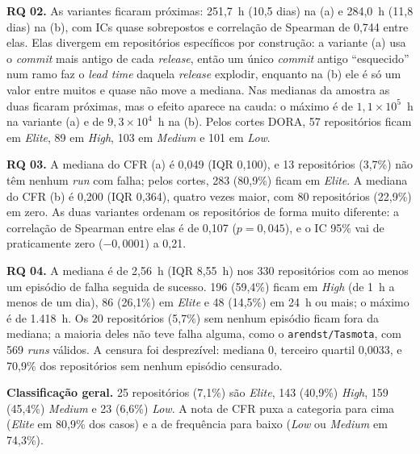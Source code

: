\textbf{RQ 02.} As variantes ficaram próximas: 251,7~h (10,5 dias) na (a) e 284,0~h (11,8
dias) na (b), com ICs quase sobrepostos e correlação de Spearman de 0,744 entre elas. Elas
divergem em repositórios específicos por construção: a variante (a) usa o \textit{commit}
mais antigo de cada \textit{release}, então um único \textit{commit} antigo ``esquecido'' num
ramo faz o \textit{lead time} daquela \textit{release} explodir, enquanto na (b) ele é só um
valor entre muitos e quase não move a mediana. Nas medianas da amostra as duas ficaram
próximas, mas o efeito aparece na cauda: o máximo é de $1{,}1 \times 10^{5}$~h na variante (a)
e de $9{,}3 \times 10^{4}$~h na (b). Pelos cortes
DORA, 57 repositórios ficam em \textit{Elite}, 89 em \textit{High}, 103 em \textit{Medium} e
101 em \textit{Low}.

\textbf{RQ 03.} A mediana do CFR (a) é 0,049 (IQR 0,100), e 13 repositórios (3,7\%) não têm
nenhum \textit{run} com falha; pelos cortes, 283 (80,9\%) ficam em \textit{Elite}. A mediana
do CFR (b) é 0,200 (IQR 0,364), quatro vezes maior, com 80 repositórios (22,9\%) em zero. As
duas variantes ordenam os repositórios de forma muito diferente: a correlação de Spearman
entre elas é de 0,107 ($p = 0{,}045$), e o IC 95\% vai de praticamente zero ($-0{,}0001$) a 0,21.

\textbf{RQ 04.} A mediana é de 2,56~h (IQR 8,55~h) nos 330 repositórios com ao menos um
episódio de falha seguida de sucesso. 196 (59,4\%) ficam em \textit{High} (de 1~h a menos de um
dia), 86 (26,1\%) em \textit{Elite} e 48 (14,5\%) em 24~h ou mais; o máximo é de 1.418~h. Os
20 repositórios (5,7\%) sem nenhum episódio ficam fora da mediana; a maioria deles não teve
falha alguma, como o \texttt{arendst/Tasmota}, com 569 \textit{runs} válidos. A censura foi
desprezível: mediana 0, terceiro quartil 0,0033, e 70,9\% dos repositórios sem nenhum episódio
censurado.

\textbf{Classificação geral.} 25 repositórios (7,1\%) são \textit{Elite}, 143 (40,9\%)
\textit{High}, 159 (45,4\%) \textit{Medium} e 23 (6,6\%) \textit{Low}. A nota de CFR puxa a
categoria para cima (\textit{Elite} em 80,9\% dos casos) e a de frequência para baixo
(\textit{Low} ou \textit{Medium} em 74,3\%).
